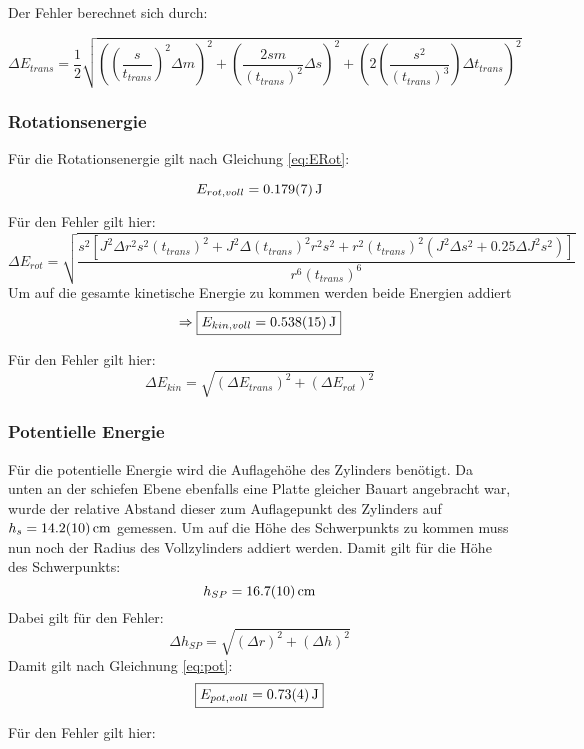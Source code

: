Der Fehler berechnet sich durch:

\begin{equation}
    \Delta E_{trans} = \frac{1}{2}\sqrt{\left(\left(\frac{s}{t_{trans}}\right)^2\Delta m\right)^2 + \left(\frac{2sm}{(t_{trans})^2}\Delta s\right)^2 +\left(2\left(\frac{s^2}{(t_{trans})^3}\right)\Delta t_{trans}\right)^2}
\end{equation}

\subsubsection{Rotationsenergie}

Für die Rotationsenergie gilt nach Gleichung \ref{eq:ERot}:

\[E_{rot,voll} = \SI{0,179 \pm 0,007}{\joule}\]

Für den Fehler gilt hier:
\[\Delta E_{rot}=\sqrt{\frac{s^{2} \left[J^{2} \Delta r^{2} s^{2} (t_{trans})^{2} + J^{2} \Delta (t_{trans})^{2} r^{2} s^{2} + r^{2} (t_{trans})^{2} \left(J^{2} \Delta s^{2} + 0.25 \Delta J^{2} s^{2}\right)\right]}{r^{6} (t_{trans})^{6}}}\]
Um auf die gesamte kinetische Energie zu kommen werden beide Energien addiert
\[\Rightarrow \boxed{E_{kin, voll} = \SI{0,538 \pm 0,015}{\joule}}\]

Für den Fehler gilt hier:
\begin{equation}
    \Delta E_{kin} = \sqrt{(\Delta E_{trans})^2 + (\Delta E_{rot})^2 }
\end{equation}

\subsubsection{Potentielle Energie}

Für die potentielle Energie wird die Auflagehöhe des Zylinders benötigt. Da unten an der schiefen Ebene ebenfalls eine Platte gleicher Bauart angebracht war,
wurde der relative Abstand dieser zum Auflagepunkt des Zylinders auf $h_s = \SI{14,2 \pm 1,0}{\cm}$ gemessen.
Um auf die Höhe des Schwerpunkts zu kommen muss nun noch der Radius des Vollzylinders addiert werden.
Damit gilt für die Höhe des Schwerpunkts:
\[h_{SP} = \SI{16,7 \pm 1,0}{\cm}\]
Dabei gilt für den Fehler:
\begin{equation}
    \Delta h_{SP} = \sqrt{(\Delta r)^2 + (\Delta h)^2}
\end{equation}
Damit gilt nach Gleichnung \ref{eq:pot}:
\[\boxed{E_{pot,voll} = \SI{0,73 \pm 0,04}{\joule}}\]

Für den Fehler gilt hier:

